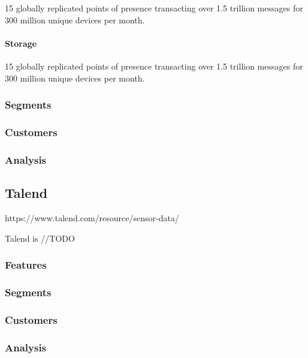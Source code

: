 15 globally replicated points of presence transacting over 1.5 trillion
messages for 300 million unique devices per month.

\paragraph{Storage}\label{storage}

15 globally replicated points of presence transacting over 1.5 trillion
messages for 300 million unique devices per month.

\subsubsection{Segments}\label{segments-1}

\subsubsection{Customers}\label{customers-1}

\subsubsection{Analysis}\label{analysis-1}

\subsection{Talend}\label{talend}

https://www.talend.com/resource/sensor-data/

Talend is //TODO

\subsubsection{Features}\label{features-2}

\subsubsection{Segments}\label{segments-2}

\subsubsection{Customers}\label{customers-2}

\subsubsection{Analysis}\label{analysis-2}
